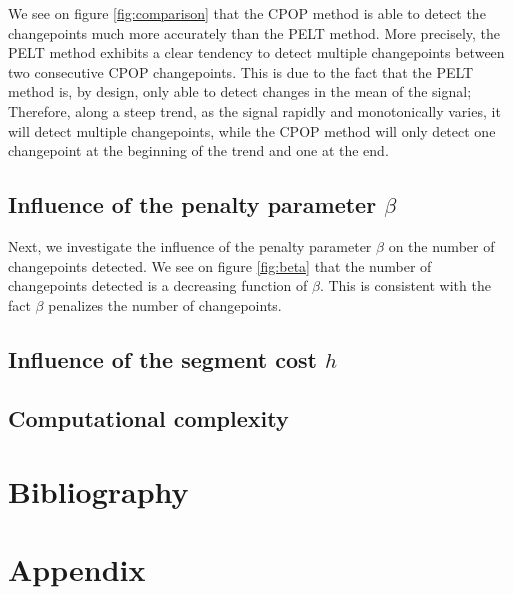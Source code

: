 \documentclass[11pt]{article}
\begin{document}
We see on figure \ref{fig:comparison} that the CPOP method is able to detect the changepoints much more accurately than the PELT method. More precisely, the PELT method exhibits a clear tendency to detect multiple changepoints between two consecutive CPOP changepoints. This is due to the fact that the PELT method is, by design, only able to detect changes in the mean of the signal; Therefore, along a steep trend, as the signal rapidly and monotonically varies, it will detect multiple changepoints, while the CPOP method will only detect one changepoint at the beginning of the trend and one at the end.

\subsection{Influence of the penalty parameter $\beta$}
Next, we investigate the influence of the penalty parameter $\beta$ on the number of changepoints detected. We see on figure \ref{fig:beta} that the number of changepoints detected is a decreasing function of $\beta$. This is consistent with the fact $\beta$ penalizes the number of changepoints.

\subsection{Influence of the segment cost $h$}

\subsection{Computational complexity}

\section{Bibliography}

\section{Appendix}
\end{document}
